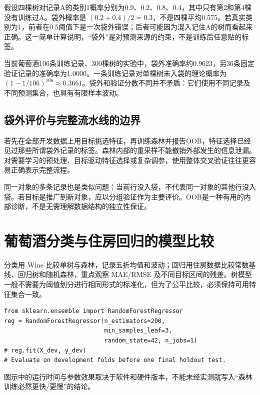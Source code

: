假设四棵树对记录A的类别1概率分别为0.9、0.2、0.8、0.4，其中只有第2和第4棵没有训练过A。袋外概率是 $(0.2+0.4)/2=0.3$，不是四棵平均0.575。若真实类别为1，前者在0.5阈值下是一次袋外错误；后者可能因为混入记住A的树而看起来正确。这一简单计算说明，“袋外”是对预测来源的约束，不是训练后任意贴的标签。

当前葡萄酒106条训练记录、300棵树的实验中，袋外准确率约0.9623，另36条固定验证记录的准确率为1.0000。一条训练记录对单棵树未入袋的理论概率为 $(1-1/106)^{106}\approx0.3661$。袋外和验证分数不同并不矛盾：它们使用不同记录及不同预测集合，也具有有限样本波动。

\subsection{袋外评价与完整流水线的边界}
若先在全部开发数据上用目标挑选特征，再训练森林并报告OOB，特征选择已经见过那些所谓袋外记录的标签。森林内部的重采样不能撤销外部发生的信息泄漏。对需要学习的预处理、目标驱动特征选择或复杂调参，使用整体交叉验证往往更容易正确表示完整流程。

同一对象的多条记录也是类似问题：当前行没入袋，不代表同一对象的其他行没入袋。若目标是推广到新对象，应以分组验证作为主要评价。OOB是一种有用的内部诊断，不是无需理解数据结构的独立性保证。

\section{葡萄酒分类与住房回归的模型比较}
分类用 Wine 比较单树与森林，记录五折均值和波动；回归用住房数据比较常数基线、回归树和随机森林，重点观察 MAE/RMSE 及不同目标区间的残差。树模型一般不需要为阈值划分进行相同形式的标准化，但为了公平比较，必须保持可用特征集合一致。

\begin{lstlisting}[caption={回归森林的可重复配置，数据由本书第5章准备}]
from sklearn.ensemble import RandomForestRegressor
reg = RandomForestRegressor(n_estimators=200,
                            min_samples_leaf=3,
                            random_state=42, n_jobs=1)
# reg.fit(X_dev, y_dev)
# Evaluate on development folds before one final holdout test.
\end{lstlisting}

图示中的运行时间与参数效果取决于软件和硬件版本，不能未经实测就写入“森林训练必然更快/更慢”的结论。

